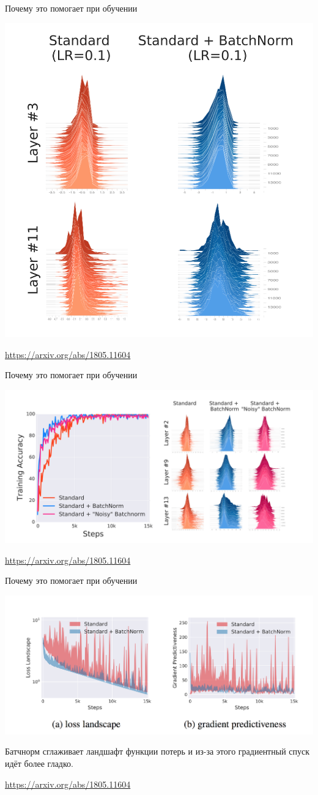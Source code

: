 \documentclass[notes,12pt, aspectratio=169]{beamer}
\begin{document}
\begin{frame}{Почему это помогает при обучении}
	\begin{center}
		\includegraphics[width=.45\linewidth]{how_bn_help_2.png}
	\end{center}
	\vfill
	\footnotesize
	{\color{blue} \url{https://arxiv.org/abs/1805.11604}}
\end{frame}


\begin{frame}{Почему это помогает при обучении}
	\begin{center}
		\includegraphics[width=.9\linewidth]{how_bn_help_3.png}
	\end{center}
	\vfill
	\footnotesize
	{\color{blue} \url{https://arxiv.org/abs/1805.11604}}
\end{frame}


\begin{frame}{Почему это помогает при обучении}
	\begin{center}
		\includegraphics[width=.8\linewidth]{how_bn_help_4.png}
		
		\alert{Батчнорм сглаживает ландшафт функции потерь и из-за этого градиентный спуск идёт более гладко.}
	\end{center}
	\vfill
	\footnotesize
	{\color{blue} \url{https://arxiv.org/abs/1805.11604}}
\end{frame}
\end{document}
